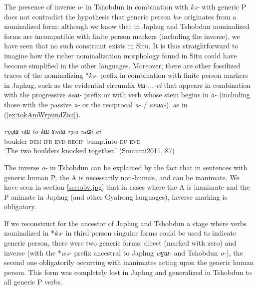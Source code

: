 \documentclass[oneside,a4paper,11pt]{article}
\newcommand{\ipa}[1]{\textit{\phon\mbox{#1}}} %
\newcommand{\refb}[1]{(\ref{#1})}
\begin{document}
 The presence of inverse \ipa{o-} in Tshobdun in combination with \ipa{kə-} with generic P does not contradict the hypothesis that generic person \ipa{kə-} originates from a nominalized form: although we know that in Japhug and Tshobdun nominalized forms are incompatible with finite person markers (including the inverse), we have seen that no such constraint exists in Situ. It is thus straightforward to imagine how the richer nominalization morphology found in Situ could have become simplified in the other languages. Moreover, there are other fossilized traces of the nominalizing *\ipa{kə-} prefix in combination with finite person markers in Japhug, such as the evidential circumfix \ipa{kɯ-}...\ipa{-ci} that appears in combination with the progressive \ipa{asɯ-} prefix or with verb whose stem begins in \ipa{a-} (including those with the passive \ipa{a-} or the reciprocal \ipa{a-} / \ipa{amɯ-}), as in \refb{ex:tokAmWrpundZici}. 


\begin{exe}
\ex \label{ex:tokAmWrpundZici}
\gll \ipa{rŋgɯ}  	\ipa{nɯ}  	\ipa{to-kɯ-ɤmɯ-rpu-ndʑi-ci}  \\
boulder \textsc{dem} \textsc{ifr}-\textsc{evd}-\textsc{recip}-bump.into-\textsc{du}-\textsc{evd} \\
\glt `The two boulders knocked together.' (Smanmi2011, 87)
\end{exe}


The inverse  \ipa{o-} in Tshobdun can be explained by  the fact that in sentences with generic human P, the A is necessarily non-human, and can be inanimate. We have seen in section \ref{sec:obv.jpg} that in cases where the A is inanimate and the P animate in Japhug (and other Gyalrong languages), inverse marking is obligatory. 


If we reconstruct for the ancestor of Japhug and Tshobdun a stage where verbs nominalized in *\ipa{kə-} in third person singular forms could be used to indicate generic person, there were two generic forms: direct (marked with zero) and inverse (with the *\ipa{wə-} prefix ancestral to Japhug \ipa{wɣɯ-} and Tshobdun \ipa{o-}), the second one obligatorily occurring with inanimates acting upon the generic human person. This form was completely lost in Japhug and generalized in Tshobdun to all generic P verbs.
\end{document}
